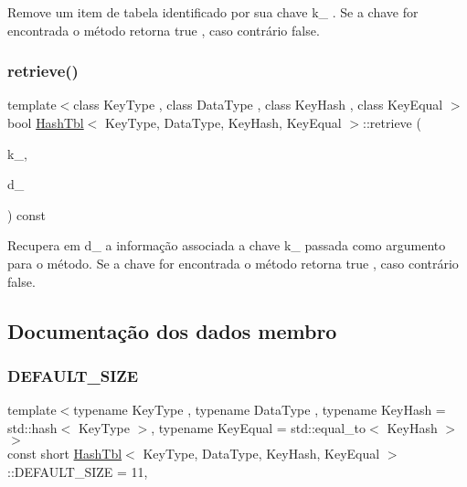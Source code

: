 Remove um item de tabela identificado por sua chave k\+\_\+ . Se a chave for encontrada o método retorna true , caso contrário false. \mbox{\label{classHashTbl_adbe3cac7c4109dd57627e1f87257202b}} 
\subsubsection{\texorpdfstring{retrieve()}{retrieve()}}
{\footnotesize\ttfamily template$<$class Key\+Type , class Data\+Type , class Key\+Hash , class Key\+Equal $>$ \\
bool \hyperlink{classHashTbl}{Hash\+Tbl}$<$ Key\+Type, Data\+Type, Key\+Hash, Key\+Equal $>$\+::retrieve (\begin{DoxyParamCaption}\item[{const Key\+Type \&}]{k\+\_\+,  }\item[{Data\+Type \&}]{d\+\_\+ }\end{DoxyParamCaption}) const\hspace{0.3cm}{\ttfamily [inline]}}

Recupera em d\+\_\+ a informação associada a chave k\+\_\+ passada como argumento para o método. Se a chave for encontrada o método retorna true , caso contrário false. 

\subsection{Documentação dos dados membro}
\mbox{\label{classHashTbl_aeffa5b1a163fb6a09a18fd254a4d6dcf}} 
\subsubsection{\texorpdfstring{D\+E\+F\+A\+U\+L\+T\+\_\+\+S\+I\+ZE}{DEFAULT\_SIZE}}
{\footnotesize\ttfamily template$<$typename Key\+Type , typename Data\+Type , typename Key\+Hash  = std\+::hash$<$ Key\+Type $>$, typename Key\+Equal  = std\+::equal\+\_\+to$<$ Key\+Hash $>$$>$ \\
const short \hyperlink{classHashTbl}{Hash\+Tbl}$<$ Key\+Type, Data\+Type, Key\+Hash, Key\+Equal $>$\+::D\+E\+F\+A\+U\+L\+T\+\_\+\+S\+I\+ZE = 11\hspace{0.3cm}{\ttfamily [static]}, {\ttfamily [private]}}

